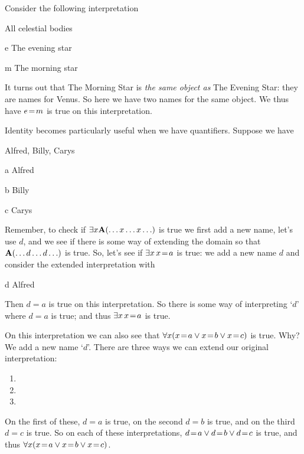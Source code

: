 Consider the following interpretation
\begin{ekey}
\item[\text{domain}] All celestial bodies
\item[e] The evening star
\item[m] The morning star
\end{ekey} It turns out that The Morning Star is \emph{the same object as} The Evening Star: they are names for Venus. So here we have two names for the same object. We thus have $e\!=\! m$ is true on this interpretation.

Identity becomes particularly useful when we have quantifiers. Suppose we have 
\begin{ekey}
\item[\text{domain}] Alfred, Billy, Carys
\item[a] Alfred
\item[b] Billy
\item[c] Carys
\end{ekey}
Remember, to check if $\exists x\mathbf{A}(\ldots x\ldots x\ldots)$ is true we first add a new name, let's use $d$, and we see if there is some way of extending the domain so that $\mathbf{A}(\ldots d\ldots d\ldots)$ is true. So, let's see if $\exists x \,x\!=\! a$ is true: we add a new name $d$ and consider the extended interpretation with 
\begin{ekey}
\item[d] Alfred
\end{ekey}
Then $d=a$ is true on this interpretation. So there is some way of interpreting `$d$' where $d=a$ is true; and thus $\exists x \, x\!=\! a$ is true.

On this interpretation we can also see that $\forall x(x\!=\! a\vee x\!=\! b\vee x\!=\! c)$ is true. Why? We add a new name `$d$'. There are three ways we can extend our original interpretation:\begin{enumerate}
\item 
{}
\item 
{}
\item 
{}
\end{enumerate}
On the first of these, $d=a$ is true, on the second $d=b$ is true, and on the third $d=c$ is true. So on each of these interpretations, $d\!=\! a\vee d\!=\! b\vee d\!=\! c$ is true, and thus $\forall x(x\!=\! a\vee x\!=\! b\vee x\!=\! c)$.



